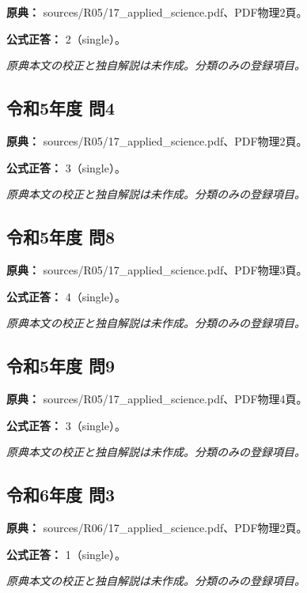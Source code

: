 \noindent\textbf{原典：} sources/R05/17\_applied\_science.pdf、PDF物理2頁。

\textbf{公式正答：} 2（single）。

\par\textit{原典本文の校正と独自解説は未作成。分類のみの登録項目。}

\subsection{令和5年度 問4}
\label{q:r05-reg-applied-04}

\noindent\textbf{原典：} sources/R05/17\_applied\_science.pdf、PDF物理2頁。

\textbf{公式正答：} 3（single）。

\par\textit{原典本文の校正と独自解説は未作成。分類のみの登録項目。}

\subsection{令和5年度 問8}
\label{q:r05-reg-applied-08}

\noindent\textbf{原典：} sources/R05/17\_applied\_science.pdf、PDF物理3頁。

\textbf{公式正答：} 4（single）。

\par\textit{原典本文の校正と独自解説は未作成。分類のみの登録項目。}

\subsection{令和5年度 問9}
\label{q:r05-reg-applied-09}

\noindent\textbf{原典：} sources/R05/17\_applied\_science.pdf、PDF物理4頁。

\textbf{公式正答：} 3（single）。

\par\textit{原典本文の校正と独自解説は未作成。分類のみの登録項目。}

\subsection{令和6年度 問3}
\label{q:r06-reg-applied-03}

\noindent\textbf{原典：} sources/R06/17\_applied\_science.pdf、PDF物理2頁。

\textbf{公式正答：} 1（single）。

\par\textit{原典本文の校正と独自解説は未作成。分類のみの登録項目。}

